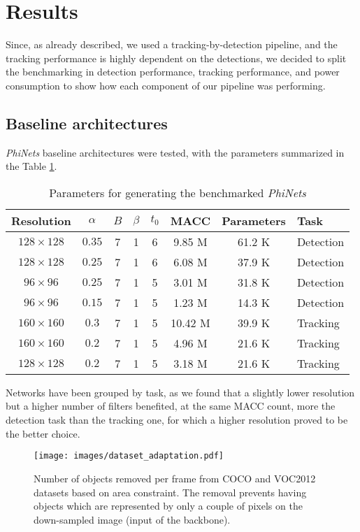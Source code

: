 \section{Results}

Since, as already described, we used a tracking-by-detection pipeline, and the tracking performance is highly dependent on the detections, we decided to split the benchmarking in detection performance, tracking performance, and power consumption to show how each component of our pipeline was performing.

\subsection{Baseline architectures}
\textit{PhiNets} baseline architectures were tested, with the parameters summarized in the Table \ref{table:params}.

\begin{table}[htbp]
\begin{tabular}{cccccccl}
\textbf{Resolution} & \textbf{$\alpha$} & \textbf{$B$} & \textbf{$\beta$} & \textbf{$t_0$} & \textbf{MACC} & \textbf{Parameters} & \textbf{Task} \\ \hline
$128 \times 128$ & $0.35$ & 7 & 1 & 6 & 9.85 M  & 61.2 K & Detection \\
$128 \times 128$ & $0.25$ & 7 & 1 & 6 & 6.08 M  & 37.9 K & Detection \\
$96 \times 96$   & $0.25$ & 7 & 1 & 5 & 3.01 M  & 31.8 K & Detection \\
$96 \times 96$   & $0.15$ & 7 & 1 & 5 & 1.23 M  & 14.3 K & Detection \\
\hline
$160 \times 160$ & $0.3$  & 7 & 1 & 5 & 10.42 M & 39.9 K & Tracking  \\
$160 \times 160$ & $0.2$  & 7 & 1 & 5 & 4.96 M  & 21.6 K & Tracking  \\
$128 \times 128$ & $0.2$  & 7 & 1 & 5 & 3.18 M  & 21.6 K & Tracking 
\end{tabular}
\caption{Parameters for generating the benchmarked \textit{PhiNets}}
\label{table:params}
\end{table}

Networks have been grouped by task, as we found that a slightly lower resolution but a higher number of filters benefited, at the same MACC count, more the detection task than the tracking one, for which a higher resolution proved to be the better choice.

\begin{figure}[H]
  \centering
  \texttt{[image: images/dataset\_adaptation.pdf]}
  \caption{Number of objects removed per frame from COCO and VOC2012 datasets based on area constraint. The removal prevents having objects which are represented by only a couple of pixels on the down-sampled image (input of the backbone).}
  \label{fig:data}
\end{figure}

